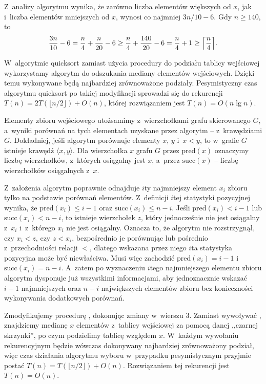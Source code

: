 \exercise %
Z~analizy algorytmu  wynika, że zarówno liczba elementów większych od $x$, jak i~liczba elementów mniejszych od $x$, wynosi co najmniej $3n/10-6$.
Gdy $n\ge140$, to
\[
	\frac{3n}{10}-6 = \frac{n}{4}+\frac{n}{20}-6 \ge \frac{n}{4}+\frac{140}{20}-6 = \frac{n}{4}+1 \ge \Bigl\lceil\frac{n}{4}\Bigr\rceil.
\]

\exercise %

\noindent W~algorytmie quicksort zamiast użycia procedury  do podziału tablicy wejściowej wykorzystamy algorytm  do odszukania mediany elementów wejściowych.
Dzięki temu wykonywane będą najbardziej zrównoważone podziały.
Pesymistyczny czas algorytmu quicksort po takiej modyfikacji sprowadzi się do rekurencji $T(n)=2T(\lfloor n/2\rfloor)+O(n)$, której rozwiązaniem jest $T(n)=O(n\lg n)$.

\exercise %
Elementy zbioru wejściowego utożsamimy z~wierzchołkami grafu skierowanego $G$, a~wyniki porównań na tych elementach uzyskane przez algorytm -- z~krawędziami $G$.
Dokładniej, jeśli algorytm porównuje elementy $x$, $y$ i~$x<y$, to w~grafie $G$ istnieje krawędź $\langle x,y\rangle$.
Dla wierzchołka $x$ grafu $G$ przez $\mathrm{pred}(x)$ oznaczymy liczbę wierzchołków, z~których osiągalny jest $x$, a~przez $\mathrm{succ}(x)$ -- liczbę wierzchołków osiągalnych z~$x$.

Z~założenia algorytm poprawnie odnajduje $i$\nbhyphen ty najmniejszy element $x_i$ zbioru tylko na podstawie porównań elementów.
Z~definicji $i$\nbhyphen tej statystyki pozycyjnej wynika, że $\mathrm{pred}(x_i)\le i-1$ oraz $\mathrm{succ}(x_i)\le n-i$.
Jeśli $\mathrm{pred}(x_i)<i-1$ lub $\mathrm{succ}(x_i)<n-i$, to istnieje wierzchołek $z$, który jednocześnie nie jest osiągalny z~$x_i$ i~z~którego $x_i$ nie jest osiągalny.
Oznacza to, że algorytm nie rozstrzygnął, czy $x_i<z$, czy $z<x_i$, bezpośrednio je porównując lub pośrednio z~przechodniości relacji $<$, dlatego wskazana przez niego $i$\nbhyphen ta statystyka pozycyjna może być niewłaściwa.
Musi więc zachodzić $\mathrm{pred}(x_i)=i-1$ i~$\mathrm{succ}(x_i)=n-i$.
A~zatem po wyznaczeniu $i$\nbhyphen tego najmniejszego elementu zbioru algorytm dysponuje już wszystkimi informacjami, aby jednoznacznie wskazać $i-1$ najmniejszych oraz $n-i$ największych elementów zbioru bez konieczności wykonywania dodatkowych porównań.

\exercise %
Zmodyfikujemy procedurę , dokonując zmiany w~wierszu 3.
Zamiast wywoływać , znajdziemy medianę $x$ elementów z~tablicy wejściowej za pomocą danej ,,czarnej skrzynki'', po czym podzielimy tablicę względem $x$.
W~każdym wywołaniu rekurencyjnym będzie wówczas dokonywany najbardziej zrównoważony podział, więc czas działania algorytmu wyboru w~przypadku pesymistycznym przyjmie postać $T(n)=T(\lfloor n/2\rfloor)+O(n)$.
Rozwiązaniem tej rekurencji jest $T(n)=O(n)$.

